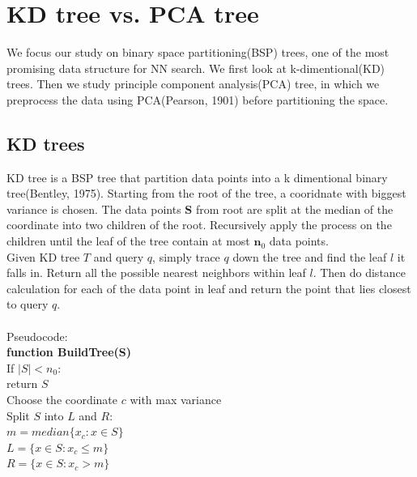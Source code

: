 \documentclass[paper=letter, fontsize=12pt]{article} %
\begin{document}
\section{KD tree vs. PCA tree}
We focus our study on binary space partitioning(BSP) trees, one of the most promising data structure for NN search. We first look at k-dimentional(KD) trees. Then we study principle component analysis(PCA) tree, in which we preprocess the data using PCA(Pearson, 1901) before partitioning the space.


\subsection{KD trees}
KD tree is a BSP tree that partition data points into a k dimentional binary tree(Bentley, 1975). Starting from the root of the tree, a cooridnate with biggest variance is chosen. The data points $\mathbf S$ from root are split at the median of the coordinate into two children of the root. Recursively apply the process on the children until the leaf of the tree contain at most $\mathbf n_0$ data points.\\
\hspace*{2em} Given KD tree $T$ and query $q$, simply trace $q$ down the tree and find the leaf $l$ it falls in. Return all the possible nearest neighbors within leaf $l$. Then do distance calculation for each of the data point in leaf and return the point that lies closest to query $q$.
\\~\\
Pseudocode:\\
\hspace*{1em} \textbf{function BuildTree(S)}\\
\hspace*{2em} If $|S| < n_0:$\\
\hspace*{3em} return $S$\\
\hspace*{2em} Choose the coordinate $c$ with max variance\\
\hspace*{2em} Split $S$ into $L$ and $R$:\\
\hspace*{3em} $m = median \{ x_c: x \in S\}$\\
\hspace*{3em} $L = \{ x \in S: x_c \leq m\}$\\
\hspace*{3em} $R = \{ x \in S: x_c > m\}$\\
\end{document}
